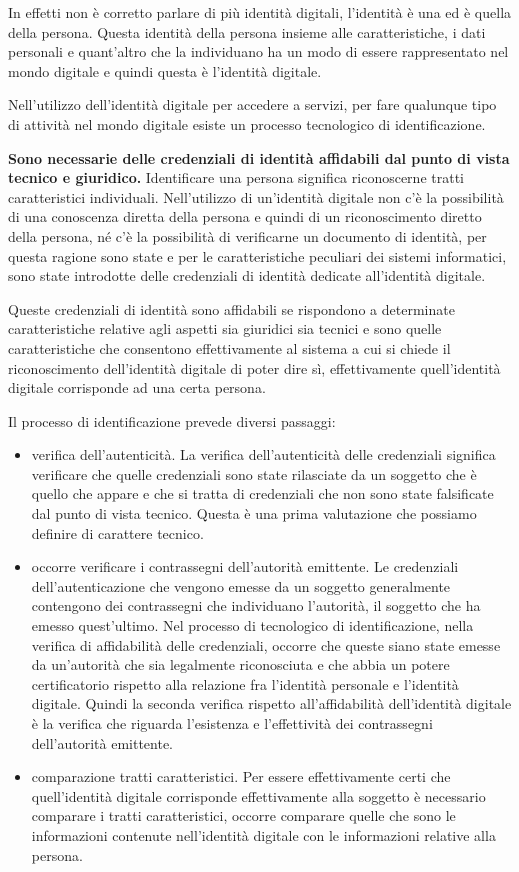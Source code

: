 In effetti non è corretto parlare di più identità digitali, l'identità è una ed è quella della persona. Questa identità della persona insieme alle caratteristiche, i dati personali e quant'altro che la  individuano ha un modo di essere rappresentato nel mondo digitale e quindi questa è l'identità digitale.\par
Nell'utilizzo dell'identità digitale per accedere a servizi, per fare qualunque tipo di attività nel mondo digitale  esiste un processo tecnologico di identificazione.\par
\textbf{Sono necessarie delle credenziali di identità affidabili dal punto di vista tecnico e giuridico.} Identificare una persona significa riconoscerne tratti caratteristici individuali. Nell'utilizzo di un'identità digitale non c'è la possibilità di una conoscenza diretta della persona e quindi di un riconoscimento diretto della persona, né c'è la possibilità di verificarne un documento di identità, per questa ragione sono state e per le caratteristiche peculiari dei sistemi informatici, sono state introdotte delle credenziali di identità dedicate all'identità digitale.\par
Queste credenziali di identità sono affidabili se rispondono a determinate caratteristiche relative agli aspetti sia giuridici sia tecnici e sono quelle caratteristiche che consentono effettivamente al sistema a cui si chiede il riconoscimento dell'identità digitale di poter dire sì, effettivamente quell'identità digitale corrisponde ad una certa persona. \par
Il processo di identificazione prevede diversi passaggi:
\begin{itemize}
    \item verifica dell'autenticità. La verifica dell'autenticità delle credenziali significa verificare che quelle credenziali sono state rilasciate da un soggetto che è quello che appare e che si tratta di credenziali che non sono state falsificate dal punto di vista tecnico. Questa è una prima valutazione che possiamo definire di carattere tecnico.
    \item occorre verificare i contrassegni dell'autorità emittente. Le credenziali dell'autenticazione che vengono emesse da un soggetto generalmente contengono dei contrassegni che individuano l'autorità, il soggetto che ha emesso quest'ultimo. Nel processo di tecnologico di identificazione, nella verifica di affidabilità delle credenziali, occorre che queste siano state emesse da un'autorità che sia legalmente riconosciuta e che abbia un potere certificatorio rispetto alla relazione fra l'identità personale e l'identità digitale. Quindi la seconda verifica rispetto all'affidabilità dell'identità digitale è la verifica che riguarda l'esistenza e l'effettività dei contrassegni dell'autorità emittente.
    \item comparazione tratti caratteristici. Per essere effettivamente certi che quell'identità digitale corrisponde effettivamente alla soggetto è necessario comparare i tratti caratteristici, occorre comparare quelle che sono le informazioni contenute nell'identità digitale con le informazioni relative alla persona.
\end{itemize}

